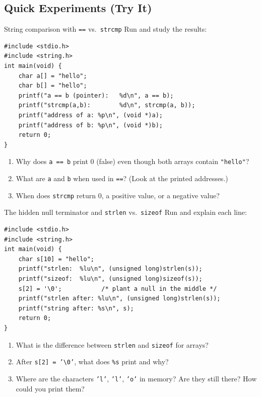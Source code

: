 \documentclass[11pt]{article}
\begin{document}
\subsection*{Quick Experiments (Try It)}

\begin{tryit}{String comparison with \texttt{==} vs.\ \texttt{strcmp}}
Run and study the results:
\begin{lstlisting}
#include <stdio.h>
#include <string.h>
int main(void) {
    char a[] = "hello";
    char b[] = "hello";
    printf("a == b (pointer):   %d\n", a == b);
    printf("strcmp(a,b):        %d\n", strcmp(a, b));
    printf("address of a: %p\n", (void *)a);
    printf("address of b: %p\n", (void *)b);
    return 0;
}
\end{lstlisting}
\begin{enumerate}[nosep,leftmargin=*]
  \item Why does \texttt{a == b} print 0 (false) even though both arrays contain \texttt{"hello"}?
  \item What are \texttt{a} and \texttt{b} when used in \texttt{==}? (Look at the printed addresses.)
  \item When does \texttt{strcmp} return 0, a positive value, or a negative value?
\end{enumerate}
\end{tryit}

\begin{tryit}{The hidden null terminator and \texttt{strlen} vs.\ \texttt{sizeof}}
Run and explain each line:
\begin{lstlisting}
#include <stdio.h>
#include <string.h>
int main(void) {
    char s[10] = "hello";
    printf("strlen:  %lu\n", (unsigned long)strlen(s));
    printf("sizeof:  %lu\n", (unsigned long)sizeof(s));
    s[2] = '\0';           /* plant a null in the middle */
    printf("strlen after: %lu\n", (unsigned long)strlen(s));
    printf("string after: %s\n", s);
    return 0;
}
\end{lstlisting}
\begin{enumerate}[nosep,leftmargin=*]
  \item What is the difference between \texttt{strlen} and \texttt{sizeof} for arrays?
  \item After \texttt{s[2] = '\textbackslash 0'}, what does \texttt{\%s} print and why?
  \item Where are the characters \texttt{'l'}, \texttt{'l'}, \texttt{'o'} in memory?
        Are they still there? How could you print them?
\end{enumerate}
\end{tryit}
\end{document}
